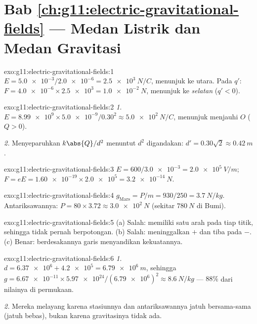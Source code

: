 \section*{Bab \ref{ch:g11:electric-gravitational-fields} --- Medan Listrik dan Medan Gravitasi}

\begin{solution}{exo:g11:electric-gravitational-fields:1}
$E = \num{5.0e-3} / \num{2.0e-6} = \qty{2.5e3}{N/C}$, menunjuk ke utara.
Pada $q'$: $F = \num{4.0e-6} \times \num{2.5e3} = \qty{1.0e-2}{N}$,
menunjuk ke \emph{selatan} ($q' < 0$).
\end{solution}

\begin{solution}{exo:g11:electric-gravitational-fields:2}
\emph{1.} $E = \num{8.99e9} \times \num{5.0e-9} / 0.30^2
\approx \qty{5.0e2}{N/C}$, menunjuk menjauhi $O$ ($Q > 0$).

\emph{2.} Menyeparuhkan $k\abs{Q}/d^2$ menuntut $d^2$ digandakan:
$d' = 0.30\sqrt{2} \approx \qty{0.42}{m}$.
\end{solution}

\begin{solution}{exo:g11:electric-gravitational-fields:3}
$E = 600 / \num{3.0e-3} = \qty{2.0e5}{V/m}$;
$F = eE = \num{1.60e-19} \times \num{2.0e5} = \qty{3.2e-14}{N}$.
\end{solution}

\begin{solution}{exo:g11:electric-gravitational-fields:4}
$g_{\text{Mars}} = P/m = 930/250 = \qty{3.7}{N/kg}$. Antariksawannya:
$P = 80 \times 3.72 \approx \qty{3.0e2}{N}$ (sekitar $\qty{780}{N}$ di
Bumi).
\end{solution}

\begin{solution}{exo:g11:electric-gravitational-fields:5}
(a) Salah:  memiliki satu arah pada tiap titik, sehingga  tidak pernah berpotongan. (b) Salah: 
meninggalkan $+$ dan tiba pada $-$. (c) Benar: berdesakannya garis
menyandikan kekuatannya.
\end{solution}

\begin{solution}{exo:g11:electric-gravitational-fields:6}
\emph{1.} $d = \num{6.37e6} + \num{4.2e5} = \qty{6.79e6}{m}$, sehingga
$g = \num{6.67e-11} \times \num{5.97e24} / (\num{6.79e6})^2
\approx \qty{8.6}{N/kg}$ --- $88\%$ dari nilainya di permukaan.

\emph{2.} Mereka melayang karena stasiunnya dan antariksawannya jatuh
bersama-sama (jatuh bebas), bukan karena gravitasinya tidak ada.
\end{solution}

